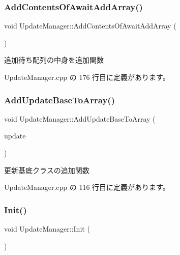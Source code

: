 \subsubsection{\texorpdfstring{Add\+Contents\+Of\+Await\+Add\+Array()}{AddContentsOfAwaitAddArray()}}
{\footnotesize\ttfamily void Update\+Manager\+::\+Add\+Contents\+Of\+Await\+Add\+Array (\begin{DoxyParamCaption}{ }\end{DoxyParamCaption})\hspace{0.3cm}{\ttfamily [private]}}



追加待ち配列の中身を追加関数 



 Update\+Manager.\+cpp の 176 行目に定義があります。

\mbox{\label{class_update_manager_afe4b39d94cde8294cc273cde32788eaa}} 
\subsubsection{\texorpdfstring{Add\+Update\+Base\+To\+Array()}{AddUpdateBaseToArray()}}
{\footnotesize\ttfamily void Update\+Manager\+::\+Add\+Update\+Base\+To\+Array (\begin{DoxyParamCaption}\item[{\mbox{\hyperlink{class_update_base}{Update\+Base}} $\ast$}]{update }\end{DoxyParamCaption})}



更新基底クラスの追加関数 



 Update\+Manager.\+cpp の 116 行目に定義があります。

\mbox{\label{class_update_manager_a7b0a2a3bf51d4fcb83fd25fe642fc66b}} 
\subsubsection{\texorpdfstring{Init()}{Init()}}
{\footnotesize\ttfamily void Update\+Manager\+::\+Init (\begin{DoxyParamCaption}{ }\end{DoxyParamCaption})}



